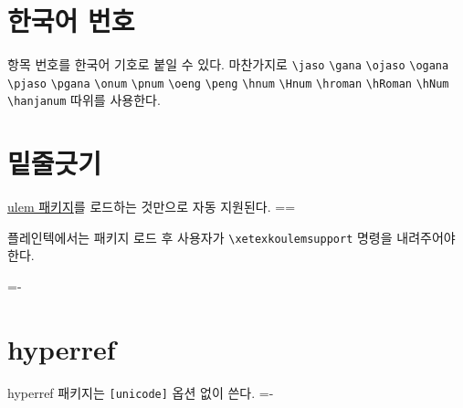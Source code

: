 \documentclass[a4paper]{article}
\def\logoko{\textsf{k}\kern-.2ex\textit{o}}
\def\kotex{\logoko\kern-.1ex .\kern-.1667em \hologo{TeX}}
\def\grayvrule{{\color{white!80!black}\vrule width 2pt}}
\newenvironment{plaintex}
  {\setbox0=\vbox\bgroup\hsize=\dimexpr\textwidth-12pt\relax\medskip\par\small}
  {\par\medskip\egroup \par\medskip\par
    \dimen0=\dimexpr\pagegoal-\pagetotal\relax
    \ifdim\ht0<\dimen0
      \hbox{\grayvrule\kern10pt\box0}%
    \else
      \setbox2=\vsplit0 to\dimen0
      \lineskip=0pt
      \ifvoid2 \else\hbox{\grayvrule\kern10pt\box2}\fi
      \ifvoid0 \else\hbox{\grayvrule\kern10pt\box0}\fi
    \fi \par\medskip\par }
\def\cs#1{\texttt{\textbackslash #1}}
\begin{document}
\section{한국어 번호}
항목 번호를 한국어 기호로 붙일 수 있다.  마찬가지로
\verb|\jaso| \verb|\gana| \verb|\ojaso| \verb|\ogana| \verb|\pjaso|
\verb|\pgana| \verb|\onum| \verb|\pnum| \verb|\oeng| \verb|\peng|
\verb|\hnum| \verb|\Hnum| \verb|\hroman| \verb|\hRoman| \verb|\hNum|
\verb|\hanjanum|
따위를 사용한다.

\section{밑줄긋기}
 \uline{ulem 패키지}를 로드하는 것만으로 자동 지원된다.
\begin{plaintex}
플레인텍에서는 패키지 로드 후 사용자가 \cs{xetexkoulemsupport}
명령을 내려주어야 한다.
\end{plaintex}

\section{hyperref}
hyperref 패키지는 \verb+[unicode]+ 옵션 없이 쓴다.
\hfill \fboxsep=-\fboxrule {}
\end{document}
